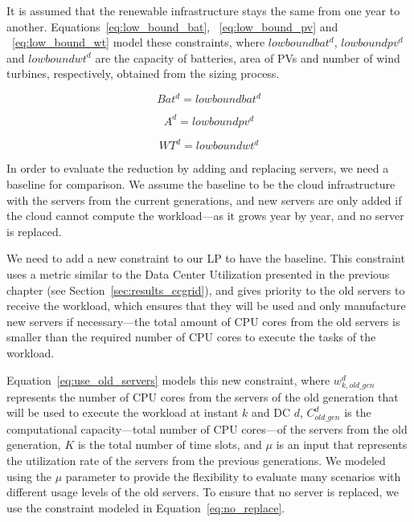 It is assumed that the renewable infrastructure stays the same from one year to another. Equations~\eqref{eq:low_bound_bat},  ~\eqref{eq:low_bound_pv} and ~\eqref{eq:low_bound_wt} model these constraints, where $lowboundbat^d$, $lowboundpv^d$ and $lowboundwt^d$ are the capacity of batteries, area of PVs and number of wind turbines, respectively, obtained from the sizing process.

\begin{equation} \label{eq:low_bound_bat}
Bat^d = lowboundbat^d
\end{equation}

\begin{equation} \label{eq:low_bound_pv}
A^d = lowboundpv^d
\end{equation}

\begin{equation} \label{eq:low_bound_wt}
WT^d = lowboundwt^d
\end{equation}


In order to evaluate the  reduction by adding and replacing servers, we need a baseline for comparison. We assume the baseline to be the cloud infrastructure with the servers from the current generations, and new servers are only added if the cloud cannot compute the workload---as it grows year by year, and no server is replaced.

 We need to add a new constraint to our LP to have the baseline. This constraint uses a metric similar to the Data Center Utilization presented in the previous chapter (see Section~\ref{sec:results_ccgrid}), and gives priority to the old servers to receive the workload, which ensures that they will be used and only manufacture new servers if necessary---the total amount of CPU cores from the old servers is smaller than the required number of CPU cores to execute the tasks of the workload. 

 Equation~\eqref{eq:use_old_servers} models this new constraint, where $w^d_{k,old\_gen}$ represents the number of CPU cores from the servers of the old generation that will be used to execute the workload at instant $k$ and DC $d$,  $C^d_{old\_gen}$ is the computational capacity---total number of CPU cores---of the servers from the old generation, $K$ is the total number of time slots, and $\mu$ is an input that represents the utilization rate of the servers from the previous generations. We modeled using the $\mu$ parameter to provide the flexibility to evaluate many scenarios with different usage levels of the old servers. To ensure that no server is replaced, we use the constraint modeled in Equation~\eqref{eq:no_replace}.

